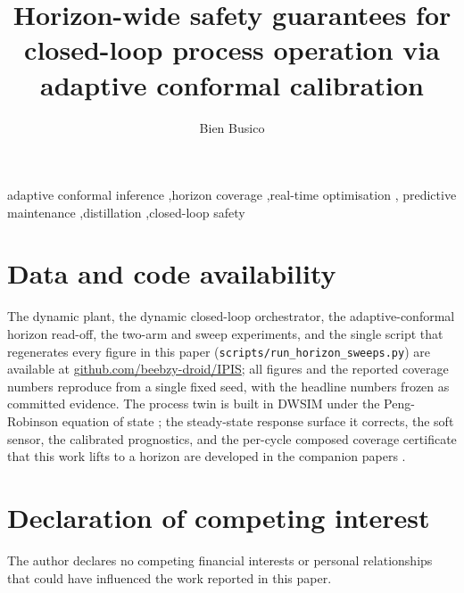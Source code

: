 \documentclass[review,12pt]{elsarticle}
\begin{document}
\begin{frontmatter}

\title{Horizon-wide safety guarantees for closed-loop process operation via adaptive
conformal calibration}

\author{Bien Busico}
\address{Map\'ua Malayan Colleges Mindanao, Davao City, Philippines}

\begin{abstract}

\end{abstract}

\begin{keyword}
adaptive conformal inference \sep horizon coverage \sep real-time optimisation \sep
predictive maintenance \sep distillation \sep closed-loop safety
\end{keyword}

\end{frontmatter}
\linenumbers









\section*{Data and code availability}
The dynamic plant, the dynamic closed-loop orchestrator, the adaptive-conformal horizon
read-off, the two-arm and sweep experiments, and the single script that regenerates every
figure in this paper (\texttt{scripts/run\_horizon\_sweeps.py}) are available at
\url{github.com/beebzy-droid/IPIS}; all figures and the reported coverage numbers reproduce
from a single fixed seed, with the headline numbers frozen as committed evidence. The
process twin is built in DWSIM \citep{dwsim} under the Peng-Robinson equation of state
\citep{peng1976}; the steady-state response surface it corrects, the soft sensor, the
calibrated prognostics, and the per-cycle composed coverage certificate that this work lifts
to a horizon are developed in the companion papers \citep{busico_m3, busico_m1, busico_m2, busico_m4}.

\section*{Declaration of competing interest}
The author declares no competing financial interests or personal relationships that
could have influenced the work reported in this paper.

\appendix




\end{document}
